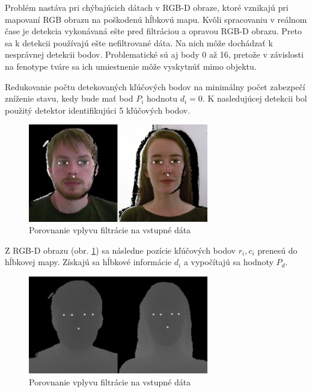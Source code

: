 Problém nastáva pri chýbajúcich dátach v RGB-D obraze, ktoré vznikajú pri mapovaní RGB obrazu na poškodenú hĺbkovú mapu. Kvôli spracovaniu v reálnom čase je detekcia vykonávaná ešte pred filtráciou a opravou RGB-D obrazu. Preto sa k detekcii používajú ešte nefiltrované dáta. Na nich môže dochádzať k nesprávnej detekcii bodov. Problematické sú aj body 0 až 16, pretože v závislosti na fenotype tváre sa ich umiestnenie môže vyskytnúť mimo objektu. 

Redukovanie počtu detekovaných kľúčových bodov na minimálny počet zabezpečí zníženie stavu, kedy bude mať bod $P_i$ hodnotu $d_i=0$. K nasledujúcej detekcii bol použitý detektor identifikujúci 5 kľúčových bodov. 
 
\begin{figure}[H]
	\centering
	\includegraphics[width=0.70\textwidth]{figures/rgbd_points.png}
	\caption{Porovnanie vplyvu filtrácie na vstupné dáta}
	\label{fig:dlib:rbbd5}
\end{figure}

\noindent Z RGB-D obrazu (obr. \ref{fig:dlib:rbbd5}) sa následne pozície kľúčových bodov $r_i, c_i$ prenesú do hĺbkovej mapy. Získajú sa hĺbkové informácie $d_i$ a vypočítajú sa hodnoty $P_d$. 

\begin{figure}[H]
	\centering
	\includegraphics[width=0.70\textwidth]{figures/depth_points.png}
	\caption{Porovnanie vplyvu filtrácie na vstupné dáta}
	\label{fig:dlib:depth5}
\end{figure}

